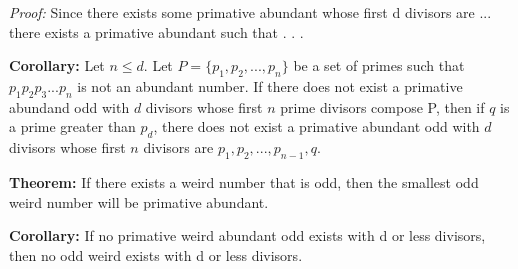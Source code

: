\documentclass[../paper.tex]{subfiles}
\begin{document}
\textit{Proof:} 
%
Since there exists some primative abundant whose first d divisors
are ... there exists a primative abundant such that 
.
.
.


\textbf{Corollary:} 
Let $n \leq d$. Let $P = \{p_1, p_2, ..., p_n\}$ be a set of primes
such that $p_1 p_2 p_3 ... p_n$ is not an abundant number.
If there does not exist a primative abundand odd with $d$ divisors
whose first $n$ prime divisors compose P, then if $q$ is a prime 
greater than $p_d$, there does not exist a primative abundant odd
with $d$ divisors whose first $n$ divisors are $p_1, p_2, ...,
p_{n-1}, q$.

\textbf{Theorem:} If there exists a weird number that is odd, 
then the smallest odd weird number will be primative abundant.

\textbf{Corollary:} If no primative weird abundant odd exists
with d or less divisors, then no odd weird exists with d or less
divisors.
\end{document}
